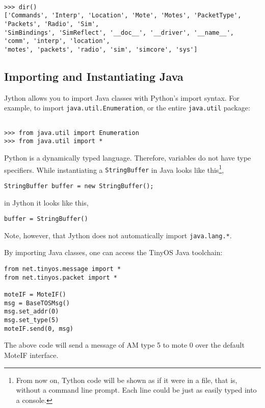 \documentclass[10pt]{article}
\newcommand{\name}{{Tython}\xspace}
\begin{document}
\begin{verbatim}

>>> dir()
['Commands', 'Interp', 'Location', 'Mote', 'Motes', 'PacketType', 'Packets', 'Radio', 'Sim', 
'SimBindings', 'SimReflect', '__doc__', '__driver', '__name__', 'comm', 'interp', 'location', 
'motes', 'packets', 'radio', 'sim', 'simcore', 'sys']
\end{verbatim}

\subsection{Importing and Instantiating Java}

Jython allows you to import Java classes with Python's import syntax.
For example, to import {\tt java.util.Enumeration}, or the entire
{\tt java.util} package:


\begin{verbatim}

>>> from java.util import Enumeration
>>> from java.util import *

\end{verbatim}

Python is a dynamically typed language. Therefore, variables do not
have type specifiers. While instantiating a {\tt StringBuffer} in
Java looks like this\footnote{From now on, \name code will be shown as if it were in a file, that is, without a command line prompt. Each line could be just as easily typed into a console.},

\begin{verbatim}
StringBuffer buffer = new StringBuffer();
\end{verbatim}

in Jython it looks like this,

\begin{verbatim}
buffer = StringBuffer()
\end{verbatim}

Note, however, that Jython does not automatically import {\tt java.lang.*}.

By importing Java classes, one can access the TinyOS Java toolchain:

\begin{verbatim}
from net.tinyos.message import *
from net.tinyos.packet import *

moteIF = MoteIF()
msg = BaseTOSMsg()
msg.set_addr(0)
msg.set_type(5)
moteIF.send(0, msg)
\end{verbatim}

The above code will send a message of AM type 5 to mote 0 over the default
MoteIF interface.
\end{document}

